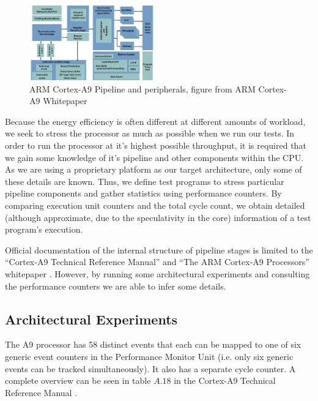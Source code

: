 \begin{figure}
    \begin{centering}
        \includegraphics[width=0.48\textwidth]{figures/A9-Pipeline-hres}
        \caption{ARM Cortex-A9 Pipeline and peripherals,\hfill
        figure from ARM Cortex-A9 Whitepaper\cite{a9whitepaper}}
        \label{fig:pipeline}
    \end{centering}
\end{figure}

Because the energy efficiency is often different at different amounts of
workload, we seek to stress the processor as much as possible when we run our
tests. In order to run the processor at it's highest possible throughput, it is
required that we gain some knowledge of it's pipeline and other components
within the CPU. As we are using a proprietary platform as our target
architecture, only some of these details are known. Thus, we define test
programs to stress particular pipeline components and gather statistics using
performance counters. By comparing execution unit counters and the total cycle
count, we obtain detailed (although approximate, due to the speculativity in the
core) information of a test program's execution. 

Official documentation of the internal structure of pipeline stages is limited
to the ``Cortex-A9 Technical Reference Manual'' \cite{armtech} and ``The ARM
Cortex-A9 Processors'' whitepaper \cite{a9whitepaper}. However, by running some
architectural experiments and consulting the performance counters we are able to
infer some details.

\subsection{Architectural Experiments}
\label{arch_experiments}
The A9 processor has 58 distinct events that each can be mapped to one of six
generic event counters in the Performance Monitor Unit (i.e. only six generic
events can be tracked simultaneously). It also has a separate cycle counter. A
complete overview can be seen in table $A.18$ in the Cortex-A9 Technical
Reference Manual \cite{armtech}.

